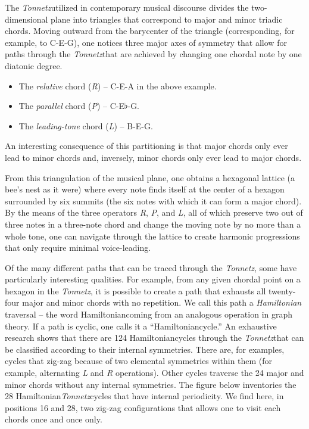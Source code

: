 \documentclass{article}
\newcommand{\Tonnetz}{\emph{Tonnetz}}
\newcommand{\Hamiltonian}{Hamiltonian}
\begin{document}
The \Tonnetz utilized in contemporary musical discourse divides the
two-dimensional plane into triangles that correspond to major and minor
triadic chords.  Moving outward from the barycenter of the triangle
(corresponding, for example, to C-E-G), one notices three major axes of
symmetry that allow for paths through the \Tonnetz that are achieved
by changing one chordal note by one diatonic degree.
\begin{itemize}
\item The \emph{relative} chord (\emph{R}) -- C-E-A in the
above example.
\item The \emph{parallel} chord (\emph{P}) --
C-E$\flat$-G.
\item The \emph{leading-tone} chord (\emph{L}) --
B-E-G.
\end{itemize}
An interesting consequence of this partitioning is that major chords only
ever lead to minor chords and, inversely, minor chords only ever lead to
major chords.

From this triangulation of the musical plane, one obtains a hexagonal
lattice (a bee's nest as it were) where every note finds itself at the
center of a hexagon surrounded by six summits (the six notes with which it
can form a major chord).  By the means of the three operators \emph{R},
\emph{P}, and \emph{L}, all of which preserve two out of three notes in a
three-note chord and change the moving note by no more than a whole tone,
one can navigate through the lattice to create harmonic progressions that
only require minimal voice-leading.

Of the many different paths that can be traced through the \Tonnetz,
some have particularly interesting qualities.  For example, from any given
chordal point on a hexagon in the \Tonnetz, it is possible to create a
path that exhausts all twenty-four major and minor chords with no
repetition.  We call this path a \emph{\Hamiltonian} traversal -- the word
\Hamiltonian coming from an analogous operation in graph theory.  If a path
is cyclic, one calls it a ``\Hamiltonian cycle.''  An exhaustive research
shows that there are 124 \Hamiltonian cycles through the \Tonnetz that can be
classified according to their internal symmetries.  There are, for examples,
cycles that zig-zag because of two elemental symmetries within them (for
example, alternating \emph{L} and \emph{R} operations).  Other cycles
traverse the 24 major and minor chords without any internal symmetries.  The
figure below inventories the 28 \Hamiltonian \Tonnetz cycles that have
internal periodicity.  We find here, in positions 16 and 28, two zig-zag
configurations that allows one to visit each chords once and once only.
\end{document}
